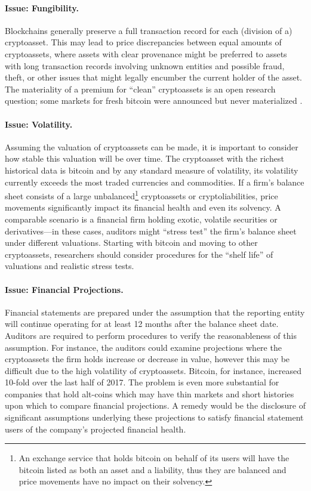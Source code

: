 \paragraph{Issue: Fungibility.} Blockchains generally preserve a full transaction record for each (division of a) cryptoasset. This may lead to price discrepancies between equal amounts of cryptoassets, where assets with clear provenance might be preferred to assets with long transaction records involving unknown entities and possible fraud, theft, or other issues that might legally encumber the current holder of the asset. The materiality of a premium for ``clean'' cryptoassets is an open research question; some markets for fresh bitcoin were announced but never materialized \todo{[c]}. 

\paragraph{Issue: Volatility.} Assuming the valuation of cryptoassets can be made, it is important to consider how stable this valuation will be over time. The cryptoasset with the richest historical data is bitcoin and by any standard measure of volatility, its volatility currently exceeds the most traded currencies and commodities. If a firm{'}s balance sheet consists of a large unbalanced\footnote{An exchange service that holds bitcoin on behalf of its users will have the bitcoin listed as both an asset and a liability, thus they are balanced and price movements have no impact on their solvency.} cryptoassets or cryptoliabilities, price movements significantly impact its financial health and even its solvency. A comparable scenario is a financial firm holding exotic, volatile securities or derivatives---in these cases, auditors might ``stress test'' the firm{'}s balance sheet under different valuations. Starting with bitcoin and moving to other cryptoassets, researchers should consider procedures for the ``shelf life'' of valuations and realistic stress tests.

\paragraph{Issue: Financial Projections.} Financial statements are prepared under the assumption that the reporting entity will continue operating for at least 12 months after the balance sheet date. Auditors are required to perform procedures to verify the reasonableness of this assumption. For instance, the auditors could examine projections where the cryptoassets the firm holds increase or decrease in value, however this may be difficult due to  the high volatility of cryptoassets. Bitcoin, for instance, increased 10-fold over the last half of 2017. The problem is even more substantial for companies that hold alt-coins which may have thin markets and short histories upon which to compare financial projections. A remedy would be the disclosure of significant assumptions underlying these projections to satisfy financial statement users of the company{'}s projected financial health. 

